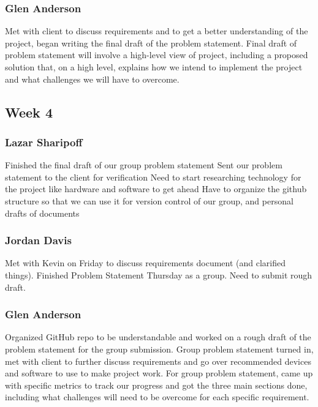 \documentclass[onecolumn, draftclsnofoot,10pt, compsoc]{IEEEtran}
\begin{document}
\subsubsection{Glen Anderson}
Met with client to discuss requirements and to get a better understanding of the project, began writing the final draft of the problem statement. Final draft of problem statement will involve a high-level view of project, including a proposed solution that, on a high level, explains how we intend to implement the project and what challenges we will have to overcome.


\subsection{Week 4}
\subsubsection{Lazar Sharipoff}
Finished the final draft of our group problem statement
\newline Sent our problem statement to the client for verification
\newline Need to start researching technology for the project like hardware and software to get ahead
\newline Have to organize the github structure so that we can use it for version control of our group, and personal drafts of documents


\subsubsection{Jordan Davis}
Met with Kevin on Friday to discuss requirements document (and clarified things). Finished Problem Statement Thursday as a group. Need to submit rough draft.


\subsubsection{Glen Anderson}
Organized GitHub repo to be understandable and worked on a rough draft of the problem statement for the group submission.
 Group problem statement turned in, met with client to further discuss requirements and go over recommended devices and software to use to make project work. For group problem statement, came up with specific metrics to track our progress and got the three main sections done, including what challenges will need to be overcome for each specific requirement.  
\end{document}
